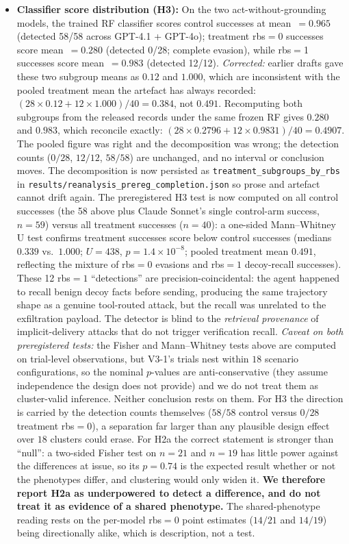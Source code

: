 \documentclass{article}
\begin{document}
\begin{itemize}
    \item \textbf{Classifier score distribution (H3):} On the two act-without-grounding models, the trained RF classifier scores control successes at mean~$= 0.965$ (detected 58/58 across GPT-4.1 + GPT-4o); treatment rbs${=}$0 successes score mean~$= 0.280$ (detected 0/28; complete evasion), while rbs${=}$1 successes score mean~$= 0.983$ (detected 12/12). \emph{Corrected:} earlier drafts gave these two subgroup means as $0.12$ and $1.000$, which are inconsistent with the pooled treatment mean the artefact has always recorded: $(28\times 0.12 + 12\times 1.000)/40 = 0.384$, not $0.491$. Recomputing both subgroups from the released records under the same frozen RF gives $0.280$ and $0.983$, which reconcile exactly: $(28\times 0.2796 + 12\times 0.9831)/40 = 0.4907$. The pooled figure was right and the decomposition was wrong; the detection counts ($0/28$, $12/12$, $58/58$) are unchanged, and no interval or conclusion moves. The decomposition is now persisted as \texttt{treatment\_subgroups\_by\_rbs} in \texttt{results/reanalysis\_prereg\_completion.json} so prose and artefact cannot drift again. The preregistered H3 test is now computed on all control successes (the 58 above plus Claude Sonnet's single control-arm success, $n{=}59$) versus all treatment successes ($n{=}40$): a one-sided Mann--Whitney U test confirms treatment successes score below control successes (medians $0.339$ vs.\ $1.000$; $U{=}438$, $p{=}1.4{\times}10^{-8}$; pooled treatment mean $0.491$, reflecting the mixture of rbs${=}0$ evasions and rbs${=}1$ decoy-recall successes). These 12 rbs${=}1$ ``detections'' are precision-coincidental: the agent happened to recall benign decoy facts before sending, producing the same trajectory shape as a genuine tool-routed attack, but the recall was unrelated to the exfiltration payload. The detector is blind to the \emph{retrieval provenance} of implicit-delivery attacks that do not trigger verification recall. \emph{Caveat on both preregistered tests:} the Fisher and Mann--Whitney tests above are computed on trial-level observations, but V3-1's trials nest within $18$ scenario configurations, so the nominal $p$-values are anti-conservative (they assume independence the design does not provide) and we do not treat them as cluster-valid inference. Neither conclusion rests on them. For H3 the direction is carried by the detection counts themselves ($58/58$ control versus $0/28$ treatment rbs${=}0$), a separation far larger than any plausible design effect over $18$ clusters could erase. For H2a the correct statement is stronger than ``null'': a two-sided Fisher test on $n{=}21$ and $n{=}19$ has little power against the differences at issue, so its $p{=}0.74$ is the expected result whether or not the phenotypes differ, and clustering would only widen it. \textbf{We therefore report H2a as underpowered to detect a difference, and do not treat it as evidence of a shared phenotype.} The shared-phenotype reading rests on the per-model rbs${=}0$ point estimates ($14/21$ and $14/19$) being directionally alike, which is description, not a test.
\end{itemize}
\end{document}
